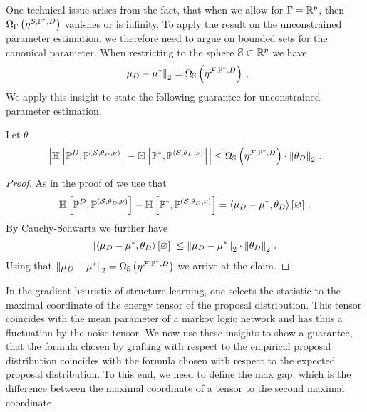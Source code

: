 One technical issue arises from the fact, that when we allow for $\Gamma=\mathbb{R}^{p}$, then $\Omega_{\Gamma}\left(\eta^{\mathcal{S},\mathbb{P}^*,D}\right)$ vanishes or is infinity.
To apply the result on the unconstrained parameter estimation, we therefore need to argue on bounded sets for the canonical parameter.
When restricting to the sphere $\mathbb{S}\subset\mathbb{R}^{p}$ we have
\begin{align*}
    \left\|\mu_{D}-\mu^*\right\|_{2} = \Omega_{\mathbb{S}}\left(\eta^{\mathcal{F},\mathbb{P}^*,D}\right) \, ,
\end{align*}
We apply this insight to state the following guarantee for unconstrained parameter estimation.
\begin{theorem}
    \label{the:detGuaranteeUnconstrained}
    Let $\theta$
    \begin{align*}
        \left|\mathbb{H}\left[\mathbb{P}^{D},\mathbb{P}^{(\mathcal{S},\theta_{D},\nu)}\right]-\mathbb{H}\left[\mathbb{P}^*,\mathbb{P}^{(\mathcal{S},\theta_{D},\nu)}\right]\right|
        \leq \Omega_{\mathbb{S}}\left(\eta^{\mathcal{F},\mathbb{P}^*,D}\right) \cdot \left\|\theta_{D}\right\|_{2} \, .
    \end{align*}
\end{theorem}
\begin{proof}
    As in the proof of  we use that
    \begin{align*}
        \mathbb{H}\left[\mathbb{P}^{D},\mathbb{P}^{(\mathcal{S},\theta_{D},\nu)}\right]-\mathbb{H}\left[\mathbb{P}^*,\mathbb{P}^{(\mathcal{S},\theta_{D},\nu)}\right]
        = \left\langle \mu_{D}-\mu^*,\theta_{D}\right\rangle \left[ \varnothing \right]  \, .
    \end{align*}
    By Cauchy-Schwartz we further have
    \begin{align*}
        \left|\left\langle \mu_{D}-\mu^*,\theta_{D}\right\rangle \left[ \varnothing \right]\right| \leq \left\|\mu_{D}-\mu^*\right\|_{2}\cdot\left\|\theta_{D}\right\|_{2} \, .
    \end{align*}
    Using that $\left\|\mu_{D}-\mu^*\right\|_{2}=\Omega_{\mathbb{S}}\left(\eta^{\mathcal{F},\mathbb{P}^*,D}\right)$ we arrive at the claim.
\end{proof}


In the gradient heuristic of structure learning, one selects the statistic to the maximal coordinate of the energy tensor of the proposal distribution.
This tensor coincides with the mean parameter of a markov logic network and has thus a fluctuation by the noise tensor.
We now use these insights to show a guarantee, that the formula chosen by grafting with respect to the empirical proposal distribution coincides with the formula chosen with respect to the expected proposal distribution.
To this end, we need to define the max gap, which is the difference between the maximal coordinate of a tensor to the second maximal coordinate.

